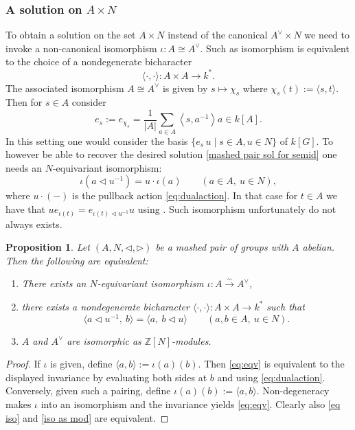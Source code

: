 \documentclass[a4paper,10pt]{amsart}
\newtheorem{proposition}[lemma]{Proposition}
\theoremstyle{definition}
\theoremstyle{remark}
\newcommand\triangler{\triangleright}
\newcommand\trianglel{\triangleleft}
\newcommand{\Z}{{\mathbb Z}}
\begin{document}
\subsubsection{A solution on $A \times N$}

To obtain a solution on the set $A \times N$ instead of the canonical $A^{\vee} \times N$ we need to invoke a non-canonical isomorphism $\iota: A \cong A^{\vee}.$ Such as isomorphism is equivalent to the choice of a nondegenerate bicharacter 
$$\langle\cdot, \cdot\rangle: A \times A \rightarrow k^*.$$
The associated isomorphism $A \cong A^{\vee}$ is given by $s \mapsto \chi_s$ where $\chi_s(t):=\langle s, t\rangle$. Then for $s \in A$ consider
$$
e_s:=e_{\chi_s}=\frac{1}{|A|} \sum_{a \in A}\left\langle s, a^{-1}\right\rangle a \in k[A].
$$
In this setting one would consider the basis $\{e_s \, u \mid s\in A, u\in N  \}$ of $k[G]$. To however be able to recover the desired solution \eqref{mashed pair sol for semid} one needs an $N$-equivariant isomorphism:
\begin{equation}\label{eq:eqv}
\iota (a\triangleleft u^{-1})=u\cdot \iota (a)
\qquad (a\in A,\ u\in N),
\end{equation}
where $u\cdot(-)$ is the pullback action \eqref{eq:dualaction}. In that case  for $t\in A$ we have that $ue_{\iota(t)} = e_{\iota(t) \trianglel u^{-1}}u$ using . Such isomorphism unfortunately do not always exists.

\begin{proposition}\label{prop:pairing}
Let $(A,N,\triangleleft, \triangler)$ be a mashed pair of groups with $A$ abelian. Then the following are equivalent:
\begin{enumerate}
    \item \label{eq iso} There exists an $N$-equivariant isomorphism $\iota :A\overset{\sim}{\to}A^\vee$, 
    \item there exists a nondegenerate bicharacter
$\langle\cdot,\cdot\rangle:A\times A\to k^*$ such that
\[
\langle a\triangleleft u^{-1},\ b\rangle=\langle a,\ b\trianglel u\rangle
\qquad (a,b\in A,\ u\in N).
\]
\item \label{iso as mod} $A$ and $A^{\vee}$ are isomorphic as $\Z[N]$-modules.
\end{enumerate}
\end{proposition}

\begin{proof}
If $\iota$ is given, define $\langle a,b\rangle:=\iota(a)(b)$.
Then \eqref{eq:eqv} is equivalent to the displayed invariance by evaluating both sides at $b$ and using \eqref{eq:dualaction}.
Conversely, given such a pairing, define $\iota (a)(b):=\langle a,b\rangle$. Non-degeneracy makes $\iota$ into an isomorphism and the invariance yields \eqref{eq:eqv}. Clearly also \eqref{eq iso} and \eqref{iso as mod} are equivalent.
\end{proof}
\end{document}

